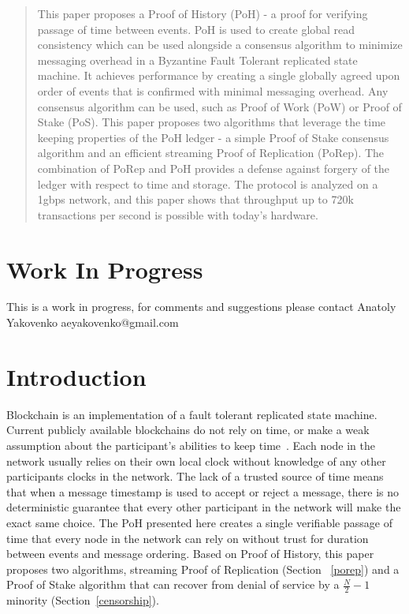 \documentclass[12pt]{article}
\begin{document}
\maketitle

\begin{abstract}
This paper proposes a Proof of History (PoH) - a proof for verifying passage of time between events. PoH is used to create global read consistency which can be used alongside a consensus algorithm to minimize messaging overhead in a Byzantine Fault Tolerant replicated state machine.  It achieves performance by creating a single globally agreed upon order of events that is confirmed with minimal messaging overhead. Any consensus algorithm can be used, such as Proof of Work (PoW) or Proof of Stake (PoS).  This paper proposes two algorithms that leverage the time keeping properties of the PoH ledger - a simple Proof of Stake consensus algorithm and an efficient streaming Proof of Replication (PoRep).  The combination of PoRep and PoH provides a defense against forgery of the ledger with respect to time and storage.  The protocol is analyzed on a 1gbps network, and this paper shows that throughput up to 720k transactions per second is possible with today's hardware.
\end{abstract}

\section{Work In Progress}
This is a work in progress, for comments and suggestions please contact Anatoly Yakovenko aeyakovenko@gmail.com

\section{Introduction}
Blockchain is an implementation of a fault tolerant replicated state machine.  Current publicly available blockchains do not rely on time, or make a weak assumption about the participant's abilities to keep time~\cite{tendermint}.  Each node in the network usually relies on their own local clock without knowledge of any other participants clocks in the network.  The lack of a trusted source of time means that when a message timestamp is used to accept or reject a message, there is no deterministic guarantee that every other participant in the network will make the exact same choice.  The PoH presented here creates a single verifiable passage of time that every node in the network can rely on without trust for duration between events and message ordering.  Based on Proof of History, this paper proposes two algorithms, streaming Proof of Replication (Section ~\ref{porep}) and a Proof of Stake algorithm that can recover from denial of service by a \(\frac{N}{2} - 1\) minority (Section~\ref{censorship}).
\end{document}

